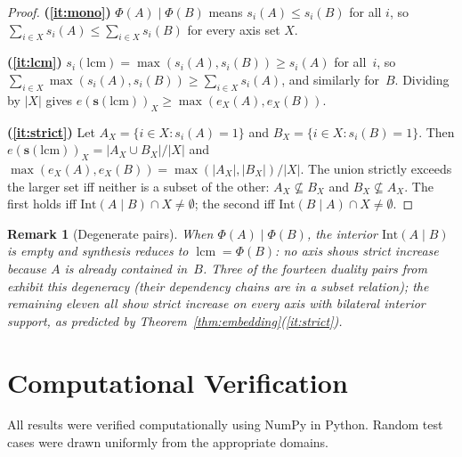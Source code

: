 \documentclass[11pt,a4paper]{article}
\newtheorem{remark}[theorem]{Remark}
\begin{document}
\begin{proof}
\textbf{(\ref{it:mono})}
$\Phi(A)\mid\Phi(B)$ means $s_i(A)\leq s_i(B)$ for all $i$, so
$\sum_{i\in X}s_i(A)\leq\sum_{i\in X}s_i(B)$ for every axis set $X$.

\textbf{(\ref{it:lcm})}
$s_i(\text{lcm})=\max(s_i(A),s_i(B))\geq s_i(A)$ for all~$i$, so
$\sum_{i\in X}\max(s_i(A),s_i(B))\geq\sum_{i\in X}s_i(A)$, and
similarly for~$B$. Dividing by $|X|$ gives
$e(\mathbf{s}(\text{lcm}))_X\geq\max(e_X(A),e_X(B))$.

\textbf{(\ref{it:strict})}
Let $A_X=\{i\in X:s_i(A)=1\}$ and $B_X=\{i\in X:s_i(B)=1\}$.
Then $e(\mathbf{s}(\text{lcm}))_X=|A_X\cup B_X|/|X|$ and
$\max(e_X(A),e_X(B))=\max(|A_X|,|B_X|)/|X|$.
The union strictly exceeds the larger set iff neither is a
subset of the other: $A_X\not\subseteq B_X$ and
$B_X\not\subseteq A_X$. The first holds iff
$\mathrm{Int}(A\!\mid\! B)\cap X\neq\emptyset$;
the second iff $\mathrm{Int}(B\!\mid\! A)\cap X\neq\emptyset$.
\end{proof}

\begin{remark}[Degenerate pairs]
When $\Phi(A)\mid\Phi(B)$, the interior $\mathrm{Int}(A\!\mid\! B)$
is empty and synthesis reduces to $\operatorname{lcm}=\Phi(B)$: no
axis shows strict increase because $A$ is already contained in~$B$.
Three of the fourteen duality pairs from~\citet{p4} exhibit this
degeneracy (their dependency chains are in a subset relation); the
remaining eleven all show strict increase on every axis with bilateral
interior support, as predicted by Theorem~\ref{thm:embedding}(\ref{it:strict}).
\end{remark}

\section{Computational Verification}
\label{sec:computation}

All results were verified computationally using NumPy in Python.
Random test cases were drawn uniformly from the appropriate domains.
\end{document}
